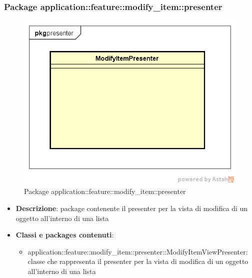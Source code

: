 \subsubsection{Package application::feature::modify\_item::presenter}
\label{Package application::feature::modify_item::presenter}
\begin{figure}[H]
	\centering
	\includegraphics[scale=0.5]{Sezioni/Packages/Application/modify_item_presenter.png}
	\caption{Package application::feature::modify\_item::presenter}
\end{figure}
\begin{itemize}
	\item \textbf{Descrizione}: package contenente il presenter per la vista di modifica di un oggetto all'interno di una lista
	\item \textbf{Classi e packages contenuti}:
	\begin{itemize}
	\item application::feature::modify\_item::presenter::ModifyItemViewPresenter: classe che rappresenta il presenter per la vista di modifica di un oggetto all'interno di una lista
	\end{itemize}
\end{itemize}


